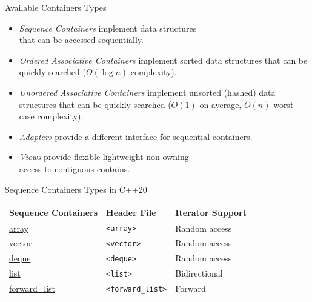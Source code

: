\documentclass[14pt,aspectratio=1610]{beamer}
\begin{document}
\begin{frame}{Available Containers Types}
\begin{itemize}[<+->]
\item
  \emph{Sequence Containers} implement data structures \\that can be accessed sequentially.
\item
  \emph{Ordered Associative Containers} implement sorted data structures that can be quickly searched (\(O(\log n)\) complexity).
\item
  \emph{Unordered Associative Containers} implement unsorted (hashed) data structures that can be quickly searched (\(O(1)\) on average, \(O(n)\) worst-case complexity).
\item
  \emph{Adapters} provide a different interface for sequential containers.
\item
  \emph{Views} provide flexible lightweight non-owning \\access to contiguous contains.
\end{itemize}
\end{frame}

\begin{frame}{Sequence Containers Types in C++20}
\renewcommand{\arraystretch}{1.1}
\begin{tabular}{l l l}
\toprule
  \textbf{Sequence Containers} & \textbf{Header File} & \textbf{Iterator Support}\\
  \midrule
  \href{https://en.cppreference.com/w/cpp/container/array}{array}
    & \lstinline{<array>} & Random access\\
  \href{https://en.cppreference.com/w/cpp/container/vector}{vector}
    & \lstinline{<vector>} & Random access\\
  \href{https://en.cppreference.com/w/cpp/container/deque}{deque}
    & \lstinline{<deque>} & Random access\\
    \href{https://en.cppreference.com/w/cpp/container/list}{list}
    & \lstinline{<list>} & Bidirectional\\
  \href{https://en.cppreference.com/w/cpp/container/forward_list}{forward\_list}
    & \lstinline{<forward_list>} & Forward\\
\bottomrule
\end{tabular}
\end{frame}
\end{document}
